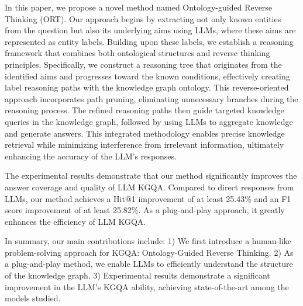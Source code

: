 In this paper, we propose a novel method named Ontology-guided Reverse Thinking (ORT). Our approach begins by extracting not only known entities from the question but also its underlying aims using LLMs, where these aims are represented as entity labels. Building upon these labels, we establish a reasoning framework that combines both ontological structures and reverse thinking principles. Specifically, we construct a reasoning tree that originates from the identified aims and progresses toward the known conditions, effectively creating label reasoning paths with the knowledge graph ontology. This reverse-oriented approach incorporates path pruning, eliminating unnecessary branches during the reasoning process. The refined reasoning paths then guide targeted knowledge queries in the knowledge graph, followed by using LLMs to aggregate knowledge and generate answers. This integrated methodology enables precise knowledge retrieval while minimizing interference from irrelevant information, ultimately enhancing the accuracy of the LLM's responses.

The experimental results demonstrate that our method significantly improves the answer coverage and quality of LLM KGQA. Compared to direct responses from LLMs, our method achieves a Hit@1 improvement of at least 25.43\% and an F1 score improvement of at least 25.82\%. As a plug-and-play approach, it greatly enhances the efficiency of LLM KGQA.

In summary, our main contributions include: 1) We first introduce a human-like problem-solving approach for KGQA: Ontology-Guided Reverse Thinking. 2) As a plug-and-play method, we enable LLMs to efficiently understand the structure of the knowledge graph. 3) Experimental results demonstrate a significant improvement in the LLM's KGQA ability, achieving state-of-the-art among the models studied.